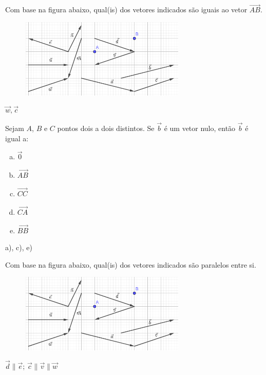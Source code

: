 \begin{exer}
  Com base na figura abaixo, qual(is) dos vetores indicados são iguais ao vetor $\overrightarrow{AB}$.
  \begin{figure}[H]
    \centering
    \includegraphics[width=0.7\textwidth]{./cap_vetor/dados/fig_exer_definicao_01/fig_exer_definicao_01}
  \end{figure}
\end{exer}
\begin{resp}
  $\vec{w}, \vec{c}$
\end{resp}

\begin{exer}
  Sejam $A$, $B$ e $C$ pontos dois a dois distintos. Se $\vec{b}$ é um vetor nulo, então $\vec{b}$ é igual a:
  \begin{enumerate}[a)]
  \item $\vec{0}$
  \item $\overrightarrow{AB}$
  \item $\overrightarrow{CC}$
  \item $\overrightarrow{CA}$
  \item $\overrightarrow{BB}$
  \end{enumerate}
\end{exer}
\begin{resp}
  a), c), e) 
\end{resp}

\begin{exer}
  Com base na figura abaixo, qual(is) dos vetores indicados são paralelos entre si.
  \begin{figure}[H]
    \centering
    \includegraphics[width=0.7\textwidth]{./cap_vetor/dados/fig_exer_definicao_01/fig_exer_definicao_01}
  \end{figure}
\end{exer}
\begin{resp}
  $\vec{d}\parallel\vec{e}$; $\vec{c}\parallel\vec{v}\parallel\vec{w}$
\end{resp}

